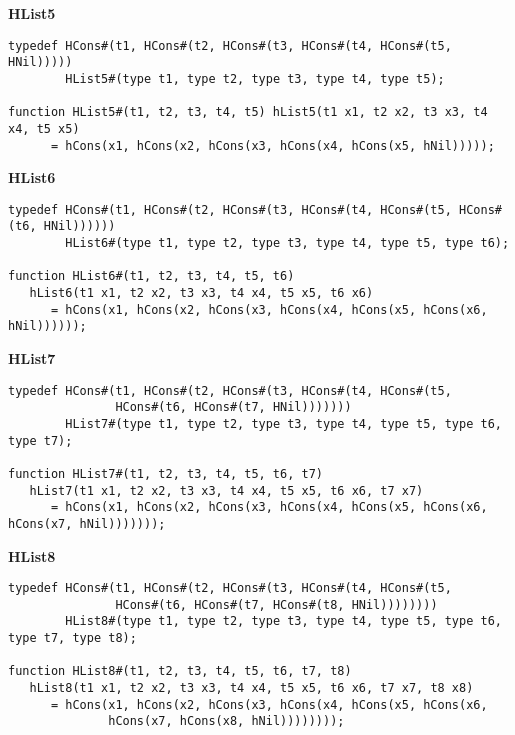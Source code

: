 {\bf HList5}
\begin{verbatim}
typedef HCons#(t1, HCons#(t2, HCons#(t3, HCons#(t4, HCons#(t5, HNil)))))
        HList5#(type t1, type t2, type t3, type t4, type t5);

function HList5#(t1, t2, t3, t4, t5) hList5(t1 x1, t2 x2, t3 x3, t4 x4, t5 x5)
      = hCons(x1, hCons(x2, hCons(x3, hCons(x4, hCons(x5, hNil)))));
\end{verbatim}

{\bf HList6}
\begin{verbatim}
typedef HCons#(t1, HCons#(t2, HCons#(t3, HCons#(t4, HCons#(t5, HCons#(t6, HNil))))))
        HList6#(type t1, type t2, type t3, type t4, type t5, type t6);

function HList6#(t1, t2, t3, t4, t5, t6) 
   hList6(t1 x1, t2 x2, t3 x3, t4 x4, t5 x5, t6 x6)
      = hCons(x1, hCons(x2, hCons(x3, hCons(x4, hCons(x5, hCons(x6, hNil))))));
\end{verbatim}

{\bf HList7}
\begin{verbatim}
typedef HCons#(t1, HCons#(t2, HCons#(t3, HCons#(t4, HCons#(t5,
               HCons#(t6, HCons#(t7, HNil)))))))
        HList7#(type t1, type t2, type t3, type t4, type t5, type t6, type t7);

function HList7#(t1, t2, t3, t4, t5, t6, t7)
   hList7(t1 x1, t2 x2, t3 x3, t4 x4, t5 x5, t6 x6, t7 x7)
      = hCons(x1, hCons(x2, hCons(x3, hCons(x4, hCons(x5, hCons(x6, hCons(x7, hNil)))))));
\end{verbatim}

{\bf HList8}

\begin{verbatim}
typedef HCons#(t1, HCons#(t2, HCons#(t3, HCons#(t4, HCons#(t5, 
               HCons#(t6, HCons#(t7, HCons#(t8, HNil))))))))
        HList8#(type t1, type t2, type t3, type t4, type t5, type t6, type t7, type t8);

function HList8#(t1, t2, t3, t4, t5, t6, t7, t8)
   hList8(t1 x1, t2 x2, t3 x3, t4 x4, t5 x5, t6 x6, t7 x7, t8 x8)
      = hCons(x1, hCons(x2, hCons(x3, hCons(x4, hCons(x5, hCons(x6, 
              hCons(x7, hCons(x8, hNil))))))));
\end{verbatim}


